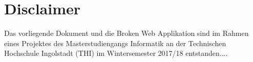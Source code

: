\chapter{Disclaimer}
\label{ch:disclaimer}

Das vorliegende Dokument und die Broken Web Applikation sind im Rahmen eines Projektes des Masterstudiengangs Informatik an der Technischen Hochschule Ingolstadt (THI) im Wintersemester 2017/18 entstanden....
